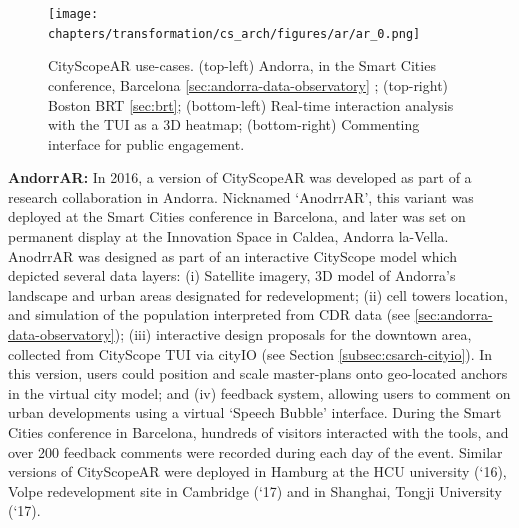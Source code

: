 {{{          \begin{figure}[!htb]
              \begin{center}
                  \texttt{[image: chapters/transformation/cs\_arch/figures/ar/ar\_0.png]}
              \end{center}
              \caption{CityScopeAR use-cases. (top-left) Andorra, in the Smart Cities conference, Barcelona \eqref{sec:andorra-data-observatory} ; (top-right) Boston BRT \eqref{sec:brt}; (bottom-left) Real-time interaction analysis with the TUI as a 3D heatmap; (bottom-right) Commenting interface for public engagement.}
              \label{fig:csar_world}
          \end{figure}


          \textbf{AndorrAR:} In 2016, a version of CityScopeAR was developed as part of a research collaboration in Andorra. Nicknamed `AnodrrAR', this variant was deployed at the Smart Cities conference in Barcelona, and later was set on permanent display at the Innovation Space in Caldea, Andorra la-Vella. AnodrrAR was designed as part of an interactive CityScope model which depicted several data layers: (i) Satellite imagery, 3D model of Andorra's landscape and urban areas designated for redevelopment; (ii) cell towers location, and simulation of the population interpreted from CDR data (see \eqref{sec:andorra-data-observatory}); (iii) interactive design proposals for the downtown area, collected from CityScope TUI via cityIO (see Section \eqref{subsec:csarch-cityio}). In this version, users could position and scale master-plans onto geo-located anchors in the virtual city model; and (iv) feedback system, allowing users to comment on urban developments using a virtual `Speech Bubble' interface.
          \newline
          During the Smart Cities conference in Barcelona, hundreds of visitors interacted with the tools, and over 200 feedback comments were recorded during each day of the event. Similar versions of CityScopeAR were deployed in Hamburg at the HCU university (`16), Volpe redevelopment site in Cambridge (`17) and in Shanghai, Tongji University (`17).
      }

}}
